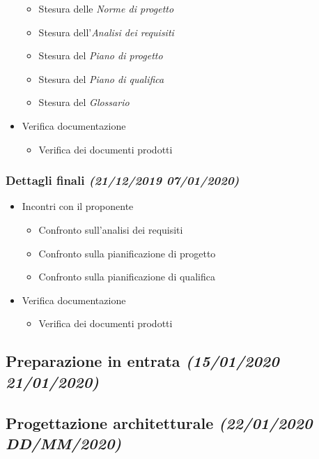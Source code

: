 \documentclass[../piano-di-progetto.tex]{subfiles}
\begin{document}
\begin{itemize}
\begin{itemize}
    \item Stesura delle \textit{Norme di progetto}
    \item Stesura dell'\textit{Analisi dei requisiti}
    \item Stesura del \textit{Piano di progetto}
    \item Stesura del \textit{Piano di qualifica}
    \item Stesura del \textit{Glossario}
  \end{itemize}
  \item Verifica documentazione
  \begin{itemize}
    \item Verifica dei documenti prodotti
  \end{itemize}
\end{itemize}
\subsubsection[Dettagli finali]{Dettagli finali {\normalsize\normalfont\itshape(21/12/2019  07/01/2020)}}%
\label{subs:dettagli_finali}
\begin{itemize}
  \item Incontri con il proponente
  \begin{itemize}
    \item Confronto sull'analisi dei requisiti
    \item Confronto sulla pianificazione di progetto
    \item Confronto sulla pianificazione di qualifica
  \end{itemize}
  \item Verifica documentazione
  \begin{itemize}
    \item Verifica dei documenti prodotti
  \end{itemize}
\end{itemize}
\subsection[Preparazione in entrata]{Preparazione in entrata {\normalsize\normalfont\itshape(15/01/2020  21/01/2020)}}%
\label{sub:preparazione_in_entrata}

\subsection[Progettazione architetturale]{Progettazione architetturale {\normalsize\normalfont\itshape(22/01/2020  DD/MM/2020)}}%
\label{sub:progettazione_architetturale}
\end{document}
